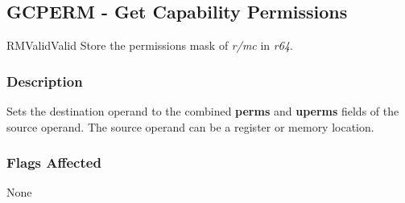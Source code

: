 \clearpage
{}
{}
\subsection*{GCPERM - Get Capability Permissions}

\begin{x86opcodetable}
  {RM}{Valid}{Valid}
  {Store the permissions mask of \emph{r/mc} in \emph{r64}.}
\end{x86opcodetable}

\begin{x86opentable}
\end{x86opentable}

\subsubsection*{Description}

Sets the destination operand to the combined \textbf{perms} and
\textbf{uperms} fields of the source operand.  The source operand can
be a register or memory location.

\subsubsection*{Flags Affected}

None
